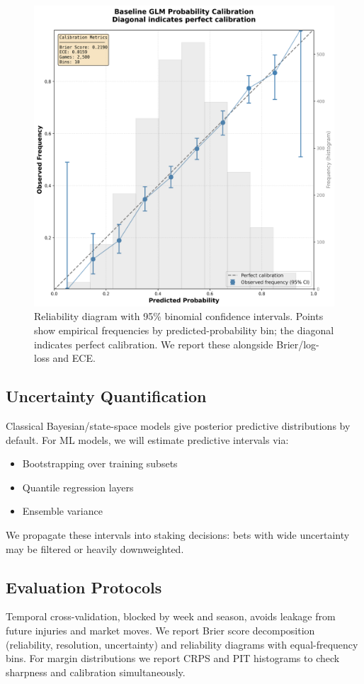\begin{figure}[t]
  \centering
  \includegraphics[width=0.9\linewidth]{../figures/reliability_diagram.png}
  \caption[Reliability diagram (95\% CIs)]{Reliability diagram with 95\% binomial confidence intervals. Points show empirical frequencies by predicted-probability bin; the diagonal indicates perfect calibration. We report these alongside Brier/log-loss and ECE.}
  \label{fig:reliability}
\end{figure}

\subsection{Uncertainty Quantification}
Classical Bayesian/state-space models give posterior predictive distributions by default.  
For ML models, we will estimate predictive intervals via:
\begin{itemize}
  \item Bootstrapping over training subsets
  \item Quantile regression layers
  \item Ensemble variance
\end{itemize}
We propagate these intervals into staking decisions: bets with wide uncertainty may be filtered or heavily downweighted.

\subsection{Evaluation Protocols}
Temporal cross-validation, blocked by week and season, avoids leakage from future injuries and market moves. We report Brier score decomposition (reliability, resolution, uncertainty) and reliability diagrams with equal-frequency bins. For margin distributions we report CRPS and PIT histograms to check sharpness and calibration simultaneously.

